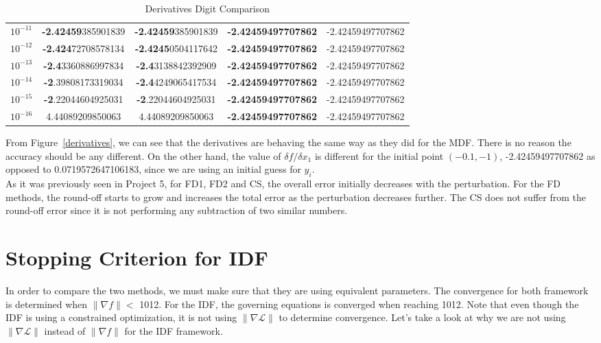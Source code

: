 \documentclass[letterpaper,12pt]{article}
\begin{document}
\begin{table}[h]
\begin{tabular}{p{1cm} c c c c}
$10^{-11}$ & {\bf-2.42459}385901839 &{\bf -2.42459}385901839 &{\bf -2.42459497707862} & -2.42459497707862\\
$10^{-12}$ & {\bf-2.424}72708578134 &{\bf -2.4245}0504117642 &{\bf -2.42459497707862} & -2.42459497707862\\
$10^{-13}$ & {\bf-2.4}3360886997834 &{\bf -2.4}3138842392909 &{\bf -2.42459497707862} & -2.42459497707862\\
$10^{-14}$ & {\bf-2}.39808173319034 &{\bf -2.4}4249065417534 &{\bf -2.42459497707862} & -2.42459497707862\\
$10^{-15}$ & {\bf-2}.22044604925031 &{\bf -2}.22044604925031 &{\bf -2.42459497707862} & -2.42459497707862\\
$10^{-16}$ & 4.44089209850063 & 4.44089209850063 & {\bf-2.42459497707862} & -2.42459497707862\\
\bottomrule %
\end{tabular}
\caption{Derivatives Digit Comparison} %
\label{deri} %
\end{table}

From Figure~\ref{derivatives}, we can see that the derivatives are behaving the same way as they did for the MDF. There is no reason the accuracy should be any different. On the other hand, the value of $\delta f / \delta x_1$ is different for the initial point $(-0.1,-1)$, -2.42459497707862 as opposed to 0.0719572647106183, since we are using an initial guess for $y_i$. \\

As it was previously seen in Project 5, for FD1, FD2 and CS, the overall error initially decreases with the perturbation. For the FD methods, the round-off starts to grow and increases the total error as the perturbation decreases further. The CS does not suffer from the round-off error since it is not performing any subtraction of two similar numbers.

\section{Stopping Criterion for IDF}
In order to compare the two methods, we must make sure that they are using equivalent parameters. The convergence for both framework is determined when $\|\nabla f\| <$ 1012. For the IDF, the governing equations is converged when reaching 1012. Note that even though the IDF is using a constrained optimization, it is not using $\|\nabla \mathcal{L}\| $ to determine convergence. Let's take a look at why we are not using $\|\nabla \mathcal{L}\| $ instead of $\|\nabla f\| $ for the IDF framework.\\
\end{document}
